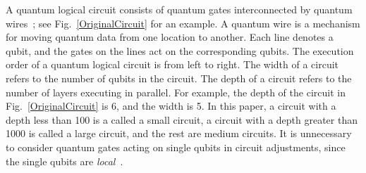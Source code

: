 \documentclass[journal]{IEEEtran}
\newcommand{\leaveout}[1]{}
\begin{document}
	A quantum logical circuit 
	consists of quantum gates interconnected by quantum wires~\cite{Daei2020}; see Fig.~\ref{OriginalCircuit} for an example.
	A quantum wire is a mechanism for moving quantum data from one location to another.
	Each line denotes a qubit, and the gates on the lines act on the corresponding qubits.
	The execution order of a quantum logical circuit  is from left to right.
	The width %
	of a circuit refers to the number of qubits in the circuit.
	The depth %
	of a circuit refers to the number of layers executing in parallel.
	For example, the depth of the circuit in Fig.~\ref{OriginalCircuit} is 6, and the width is 5.
	In this paper, a circuit with a depth less than 100 is a called a small circuit,
	a circuit with a depth greater than 1000 is called a large circuit,
	and the rest are medium circuits.
	It is unnecessary to consider quantum gates acting on single qubits in circuit adjustments, since the single qubits are \textit{local}~\cite{Shafaei2013}.
\end{document}
